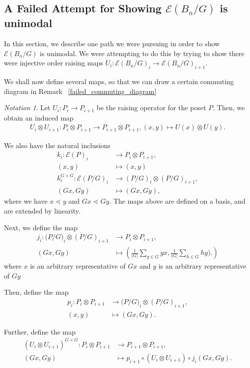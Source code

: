 \documentclass[10 pt]{amsart}
\theoremstyle{plain}
\theoremstyle{definition}
\theoremstyle{remark}
\newtheorem{note}[thm]{Notation}
\numberwithin{equation}{section}
\newcommand\ssec{\subsection}
\begin{document}
\ssec{A Failed Attempt for Showing $\mathcal E(B_n/G)$ is unimodal}

In this section, we describe one path we were pursuing in order to show $\mathcal E(B_n/G)$ is unimodal. We were attempting to do this by trying to show there were injective order raising maps $U_i:\mathcal E(B_n/G)_i \rightarrow \mathcal E(B_n/G)_{i+1}.$

We shall now define several maps, so that we can draw a certain commuting diagram in Remark ~\ref{failed_commuting_diagram}


\begin{note}
Let $U_i:P_i \rightarrow P_{i+1}$ be the raising operator for the poset $P.$ Then, we obtain an induced map
\begin{align*}
	U_i \otimes U_{i+1}:P_i\otimes P_{i+1} \rightarrow P_{i+1} \otimes P_{i+1},(x,y) \mapsto U(x) \otimes U(y).
\end{align*}

We also have the natural inclusions
\begin{align*}
	k_i:\mathcal E(P)_i &\rightarrow P_i \otimes P_{i+1},\\
	(x, y) &\mapsto (x, y)\\
	k_i^{G\times G}:\mathcal E(P/G)_i &\rightarrow (P/G)_i \otimes (P/G)_{i+1},\\
	(Gx, Gy) &\mapsto (Gx, Gy),
\end{align*}
where we have $x \lessdot y$ and $Gx \lessdot Gy.$ The maps above are defined on a basis, and are extended by linearity.

Next, we define the map
\begin{align*}
	j_i:\mathcal (P/G)_i \otimes (P/G)_{i+1} & \rightarrow P_i \otimes P_{i+1},\\
	(Gx, Gy) &\mapsto \left(\frac{1}{|G|}\sum_{g \in G}^{} gx, \frac{1}{|G|}\sum_{h\in G}^{}hy).\right)
\end{align*}
where $x$ is an arbitrary representative of $Gx$ and $y$ is an arbitrary representative of $Gy$

Then, define the map
\begin{align*}
	p_i: P_i \otimes P_{i+1} &\rightarrow \mathcal (P/G)_i \otimes (P/G)_{i+1},\\
	(x, y) &\mapsto (Gx, Gy).
\end{align*}

Further, define the map 
\begin{align*}
	(U_i \otimes U_{i+1})^{G\times G}:P_i\otimes P_{i+1} &\rightarrow P_{i+1} \otimes P_{i+1},\\
	(Gx, Gy) &\mapsto p_{i+1}\circ(U_i \otimes U_{i+1})\circ j_i(Gx, Gy).
\end{align*}


\end{note}
\end{document}
